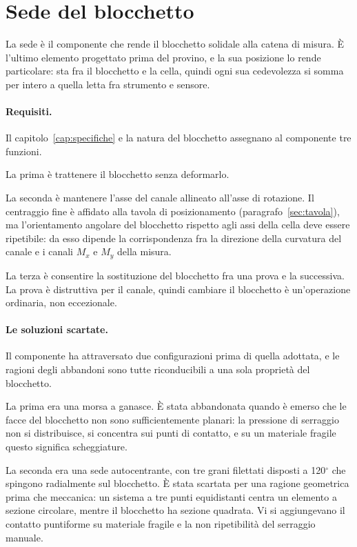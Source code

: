 \section{Sede del blocchetto}
\label{sec:sede}


La sede è il componente che rende il blocchetto solidale alla catena di misura.
È l'ultimo elemento progettato prima del provino, e la sua posizione lo rende
particolare: sta fra il blocchetto e la cella, quindi ogni sua cedevolezza si
somma per intero a quella letta fra strumento e sensore.

\paragraph{Requisiti.}
Il capitolo~\ref{cap:specifiche} e la natura del blocchetto assegnano al
componente tre funzioni.

La prima è trattenere il blocchetto senza deformarlo.

La seconda è mantenere l'asse del canale allineato all'asse di rotazione. Il
centraggio fine è affidato alla tavola di posizionamento
(paragrafo~\ref{sec:tavola}), ma l'orientamento angolare del blocchetto rispetto
agli assi della cella deve essere ripetibile: da esso dipende la corrispondenza
fra la direzione della curvatura del canale e i canali $M_x$ e $M_y$ della
misura.

La terza è consentire la sostituzione del blocchetto fra una prova e la
successiva. La prova è distruttiva per il canale, quindi cambiare il blocchetto è un'operazione ordinaria, non eccezionale.

\paragraph{Le soluzioni scartate.}
Il componente ha attraversato due configurazioni prima di quella adottata, e le
ragioni degli abbandoni sono tutte riconducibili a una sola proprietà del
blocchetto.

La prima era una morsa a ganasce. È stata abbandonata quando è emerso che le
facce del blocchetto non sono sufficientemente planari: la pressione di
serraggio non si distribuisce, si concentra sui punti di contatto, e su un
materiale fragile questo significa scheggiature.

La seconda era una sede autocentrante, con tre grani filettati disposti a
120$^\circ$ che spingono radialmente sul blocchetto. È stata scartata per una
ragione geometrica prima che meccanica: un sistema a tre punti equidistanti
centra un elemento a sezione circolare, mentre il blocchetto ha sezione
quadrata. Vi si aggiungevano il contatto puntiforme su materiale fragile e
la non ripetibilità del serraggio manuale.

